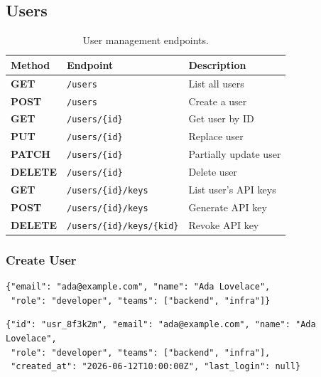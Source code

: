 \documentclass[
    language=english,
    doctype=article,
    institution=none,
]{../../omnilatex}
\newcommand{\methodget}{\textcolor{green!50!black}{\textbf{GET}}}
\newcommand{\methodpost}{\textcolor{blue!70!black}{\textbf{POST}}}
\newcommand{\methodput}{\textcolor{orange!80!black}{\textbf{PUT}}}
\newcommand{\methodpatch}{\textcolor{purple!70!black}{\textbf{PATCH}}}
\newcommand{\methoddelete}{\textcolor{red!70!black}{\textbf{DELETE}}}
\begin{document}
\subsection{Users}
\label{sec:users}
\begin{table}[htbp]
    \centering
    \caption{User management endpoints.}
    \label{tab:users-ep}
    \begin{tabular}{@{}llp{5cm}@{}}
        \toprule
        \textbf{Method} & \textbf{Endpoint} & \textbf{Description} \\
        \midrule
        \methodget    & \texttt{/users}                        & List all users \\
        \methodpost   & \texttt{/users}                        & Create a user \\
        \methodget    & \texttt{/users/\{id\}}                 & Get user by ID \\
        \methodput    & \texttt{/users/\{id\}}                 & Replace user \\
        \methodpatch  & \texttt{/users/\{id\}}                 & Partially update user \\
        \methoddelete & \texttt{/users/\{id\}}                 & Delete user \\
        \methodget    & \texttt{/users/\{id\}/keys}            & List user's API keys \\
        \methodpost   & \texttt{/users/\{id\}/keys}            & Generate API key \\
        \methoddelete & \texttt{/users/\{id\}/keys/\{kid\}}    & Revoke API key \\
        \bottomrule
    \end{tabular}
\end{table}

\subsubsection{Create User}
\begin{reqbox}
\begin{verbatim}
{"email": "ada@example.com", "name": "Ada Lovelace",
 "role": "developer", "teams": ["backend", "infra"]}
\end{verbatim}
\end{reqbox}
\begin{resbox}[201 Created]
\begin{verbatim}
{"id": "usr_8f3k2m", "email": "ada@example.com", "name": "Ada Lovelace",
 "role": "developer", "teams": ["backend", "infra"],
 "created_at": "2026-06-12T10:00:00Z", "last_login": null}
\end{verbatim}
\end{resbox}
\end{document}
